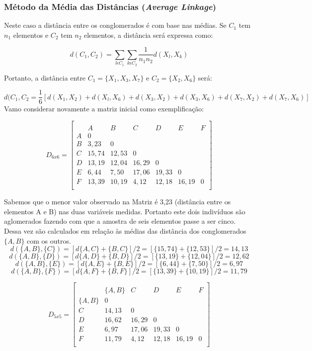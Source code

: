 \documentclass[
]{book}
\begin{document}
\hypertarget{muxe9todo-da-muxe9dia-das-distuxe2ncias-average-linkage}{%
\subsubsection{\texorpdfstring{Método da Média das Distâncias (\emph{Average Linkage})}{Método da Média das Distâncias (Average Linkage)}}\label{muxe9todo-da-muxe9dia-das-distuxe2ncias-average-linkage}}

Neste caso a distância entre os conglomerados é com base nas médias. Se \(C_1\) tem \(n_1\) elementos e \(C_2\) tem \(n_2\) elementos, a distância será expressa como:

\begin{equation}
d(C_1,C_2)=\displaystyle \sum_{l\epsilon C_1} \sum_{k\epsilon C_2} \frac{1}{n_1 n_2} d(X_l,X_k)
 \label{eq:ligmedia}
\end{equation}

Portanto, a distância entre \(C_1=\{X_1,X_3,X_7\}\) e \(C_2=\{X_2,X_6\}\) será:

\[d(C_1,C_2=\frac{1}{6}[d(X_1,X_2)+d(X_l,X_6)+d(X_3,X_2)+d(X_3,X_6)+d(X_7,X_2)+d(X_7,X_6)]\]
Vamo considerar novamente a matriz inicial como exemplificação:

\[D_{6x6}=\begin{bmatrix}\\
 &A&B&C&D&E&F \\
 A&0&&&&&\\
 B&3,23&0&&&&\\
 C & 15,74& 12,53&0&&&\\
 D& 13,19& 12,04& 16,29&0&&\\
 E& 6,44& 7,50& 17,06& 19,33&0&\\
 F& 13,39& 10,19& 4,12& 12,18& 16,19&0 \\
\end{bmatrix}\]

Sabemos que o menor valor observado na Matriz é 3,23 (distância entre os elementos A e B) nas duas variáveis medidas. Portanto este dois indivíduos são aglomerados fazendo com que a amostra de seis elementos passe a ser cinco. Dessa vez são calculados em relação às médias das distância dos conglomerados \(\{A,B\}\) com os outros.
\[d(\{A,B\},\{C\})=[d\{A,C\}+\{B,C\}]/2=[\{15,74\}+\{12,53\}]/2=14,13\]
\[d(\{A,B\},\{D\})=[d\{A,D\}+\{B,D\}]/2=[\{13,19\}+\{12,04\}]/2=12,62\]
\[d(\{A,B\},\{E\})=[d\{A,E\}+\{B,E\}]/2=[\{6,44\}+\{7,50\}]/2=6,97\]
\[d(\{A,B\},\{F\})=[d\{A,F\}+\{B,F\}]/2=[\{13,39\}+\{10,19\}]/2=11,79\]

\[D_{5x5}=\begin{bmatrix}\\
 &\{A,B\}&C&D&E&F \\
 \{A,B\}&0&&&&\\
 C & 14,13&0&&&\\
 D& 16,62& 16,29&0&&\\
 E& 6,97& 17,06& 19,33&0&\\
 F& 11,79& 4,12& 12,18& 16,19&0 \\
\end{bmatrix}\]
\end{document}

